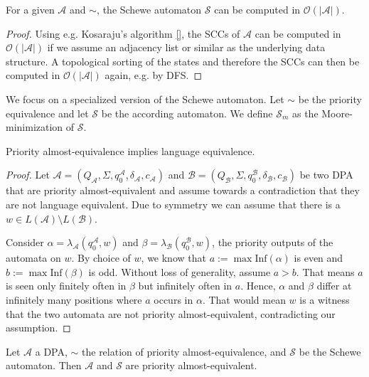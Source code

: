 \begin{lem}
	For a given $\mathcal{A}$ and $\sim$, the Schewe automaton $\mathcal{S}$ can be computed in $\mathcal{O}(|\mathcal{A}|)$.
\end{lem}

\begin{proof}
	Using e.g. Kosaraju's algorithm \ref{}, the SCCs of $\mathcal{A}$ can be computed in $\mathcal{O}(|\mathcal{A}|)$ if we assume an adjacency list or similar as the underlying data structure. A topological sorting of the states and therefore the SCCs can then be computed in $\mathcal{O}(|\mathcal{A}|)$ again, e.g. by DFS.
\end{proof}

We focus on a specialized version of the Schewe automaton. Let $\sim$ be the priority equivalence and let $\mathcal{S}$ be the according automaton. We define $\mathcal{S}_m$ as the Moore-minimization of $\mathcal{S}$.

\begin{lem}
	Priority almost-equivalence implies language equivalence.
\end{lem}

\begin{proof}
	Let $\mathcal{A} = (Q_\mathcal{A}, \Sigma, q_0^\mathcal{A}, \delta_\mathcal{A}, c_\mathcal{A})$ and $\mathcal{B} = (Q_\mathcal{B}, \Sigma, q_0^\mathcal{B}, \delta_\mathcal{B}, c_\mathcal{B})$ be two DPA that are priority almost-equivalent and assume towards a contradiction that they are not language equivalent. Due to symmetry we can assume that there is a $w \in L(\mathcal{A}) \setminus L(\mathcal{B})$. 
	
	Consider $\alpha = \lambda_\mathcal{A}(q_0^\mathcal{A}, w)$ and $\beta = \lambda_\mathcal{B}(q_0^\mathcal{B}, w)$, the priority outputs of the automata on $w$. By choice of $w$, we know that $a := \max \text{Inf}(\alpha)$ is even and $b := \max \text{Inf}(\beta)$ is odd. Without loss of generality, assume $a > b$. That means $a$ is seen only finitely often in $\beta$ but infinitely often in $a$. Hence, $\alpha$ and $\beta$ differ at infinitely many positions where $a$ occurs in $\alpha$. That would mean $w$ is a witness that the two automata are not priority almost-equivalent, contradicting our assumption.
\end{proof}

\begin{lem}
	Let $\mathcal{A}$ a DPA, $\sim$ the relation of priority almost-equivalence, and $\mathcal{S}$ be the Schewe automaton. Then $\mathcal{A}$ and $\mathcal{S}$ are priority almost-equivalent.
\end{lem}

